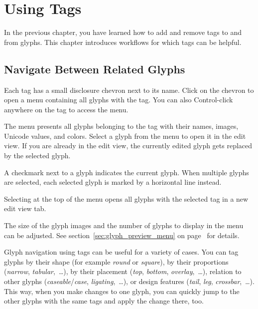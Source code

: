 \chapter{Using Tags}%
\label{cha:using_tags}

In the previous chapter, you have learned how to add and remove tags to and from glyphs.
This chapter introduces workflows for which tags can be helpful.

\section{Navigate Between Related Glyphs}%
\label{sec:navigate_between_related_glyphs}

Each tag has a small disclosure chevron next to its name.
Click on the chevron to open a menu containing all glyphs with the tag.
You can also Control-click anywhere on the tag to access the menu.

\medbreak\noindent{}

\medbreak\noindent The menu presents all glyphs belonging to the tag with their names, images, Unicode values, and colors.
Select a glyph from the menu to open it in the edit view.
If you are already in the edit view, the currently edited glyph gets replaced by the selected glyph.

A checkmark next to a glyph indicates the current glyph.
When multiple glyphs are selected, each selected glyph is marked by a horizontal line instead.

Selecting  at the top of the menu opens all glyphs with the selected tag in a new edit view tab.

The size of the glyph images and the number of glyphs to display in the menu can be adjusted.
See section~\ref{sec:glyph_preview_menu} on page~\pageref{sec:glyph_preview_menu} for details.

Glyph navigation using tags can be useful for a variety of cases.
You can tag glyphs by their shape (for example \emph{round} or \emph{square}),
by their proportions (\emph{narrow}, \emph{tabular},~…),
by their placement (\emph{top}, \emph{bottom}, \emph{overlay},~…),
relation to other glyphs (\emph{caseable}/\emph{case}, \emph{ligating},~…), or
design features (\emph{tail}, \emph{leg}, \emph{crossbar},~…).
This way, when you make changes to one glyph, you can quickly jump to the other glyphs with the same tags and apply the change there, too.

